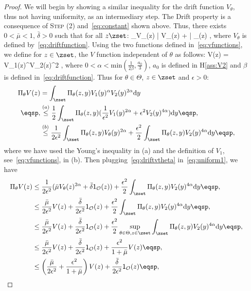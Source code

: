 \documentclass{article} %
\begin{document}
\begin{proof}
We will begin by showing a similar inequality for the drift function $V_\theta$, thus not having uniformity, as an intermediary step.
The Drift property is a consequence of \textsc{Step (2)} and~\eqref{eq:constant} shown above.
Thus, there exists $0 < \bar{\mu} < 1$, $\bar{\delta} > 0$ such that for all $z \zset$:
\beq\label{eq:driftvtheta}
\Pi_\theta V_\theta(z) \leq \bar{\mu} V_\theta(z) + \bar{\delta} _{}(z) \eqsp,
\eeq
where $V_\theta$ is defined by~\eqref{eq:driftfunction}.
Using the two functions defined in~\eqref{eq:vfunctions}, we define for $z \in \zset$, the $V$ function independent of $\theta$ as follows:
\beq\label{eq:defv}
V(z) = V_1(z)^\alpha V_2(z)^{2\alpha} \eqsp,
\eeq
where $0 < \alpha < \textrm{min}(\frac{1}{2\beta},\frac{a_0}{3})$, $a_0$ is defined in H\ref{ass:V2} and $\beta$ is defined in~\eqref{eq:driftfunction}.
Thus for $\theta \in \Theta$, $z \in \zset$ and $\epsilon >0$:
\begin{align}\notag
\Pi_\theta V(z) & = \int_{\zset} \Pi_\theta(z,y) V_1(y)^\alpha V_2(y)^{2\alpha} \textrm{d}y\\ \notag \eqsp,
& \overset{(a)}{\leq} \frac{1}{2} \int_{\zset} \Pi_\theta(z,y) (\frac{1}{\epsilon^2}V_1(y)^{2\alpha} + \epsilon^2 V_2(y)^{4\alpha}) \textrm{d}y \eqsp,\\ 
& \overset{(b)}{\leq} \frac{1}{2\epsilon^2} \int_{\zset} \Pi_\theta(z,y) V_\theta(y)^{2\alpha} + \frac{\epsilon^2}{2}  \int_{\zset} \Pi_\theta(z,y)  V_2(y)^{4\alpha} \textrm{d}y \label{eq:uniform1} \eqsp,
\end{align}
where we have used the Young's inequality in (a) and the definition of $V_1$, see~\eqref{eq:vfunctions}, in (b).
Then plugging~\eqref{eq:driftvtheta} in~\eqref{eq:uniform1}, we have
\begin{align}
\Pi_\theta V(z) & \leq \frac{1}{2\epsilon^2} (\bar{\mu} V_\theta(z)^{2\alpha} + \bar{\delta} \mathsf{1}_{\mathcal{O}}(z) ) + \frac{\epsilon^2}{2}  \int_{\zset} \Pi_\theta(z,y)  V_2(y)^{4\alpha} \textrm{d}y \eqsp,\\
& \leq \frac{\bar{\mu}}{2 \epsilon^2} V(z) +\frac{\bar{\delta}}{2 \epsilon^2} \mathsf{1}_{\mathcal{O}}(z)  + \frac{\epsilon^2}{2}  \int_{\zset} \Pi_\theta(z,y)  V_2(y)^{4\alpha} \textrm{d}y \eqsp,\\
& \leq \frac{\bar{\mu}}{2 \epsilon^2} V(z) +\frac{\bar{\delta}}{2 \epsilon^2} \mathsf{1}_{\mathcal{O}}(z)  + \frac{\epsilon^2}{2} \sup \limits_{\theta \in \Theta, z \in \zset} \int_{\zset} \Pi_\theta(z,y)  V_2(y)^{4\alpha} \textrm{d}y \eqsp,\\
& \leq \frac{\bar{\mu}}{2 \epsilon^2} V(z) +\frac{\bar{\delta}}{2 \epsilon^2} \mathsf{1}_{\mathcal{O}}(z)  + \frac{\epsilon^2}{1 + \bar{\mu}}V(z) \eqsp,\\
& \leq \left(\frac{\bar{\mu}}{2 \epsilon^2} + \frac{\epsilon^2}{1 + \bar{\mu}} \right) V(z) +\frac{\bar{\delta}}{2 \epsilon^2} \mathsf{1}_{\mathcal{O}}(z) \eqsp,
\end{align}


\end{proof}
\end{document}
